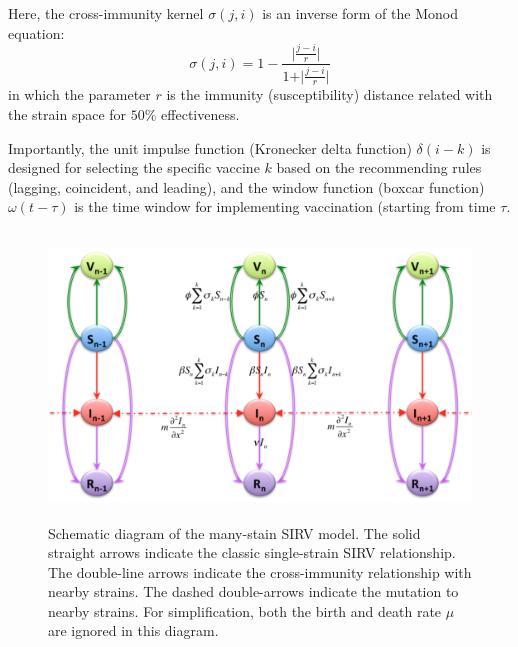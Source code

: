 \documentclass[preprint,12pt]{elsarticle}
\begin{document}
Here, the cross-immunity kernel \(\sigma(j,i)\) is an inverse form of the Monod equation:
\begin{equation}
  \label{eq:Immunity}
  \sigma(j,i) = 1 - \frac{\vert {\frac{j-i}{r}} \vert}{1 + \vert {\frac{j-i}{r}} \vert}
\end{equation}
in which the parameter \(r\) is the immunity (susceptibility) distance related with the strain space for \(50\%\) effectiveness. 

Importantly, the unit impulse function (Kronecker delta function) \(\delta(i-k)\) is designed for selecting the specific vaccine \(k\) based on the recommending rules (lagging, coincident, and leading), and the window function (boxcar function) \(\omega(t-\tau)\) is the time window for implementing vaccination (starting from time \(\tau\).

\begin{figure}
  \centering
  \includegraphics[width=6in,height=3in]{figures/Diagram}
  \caption{Schematic diagram of the many-stain SIRV model.
  The solid straight arrows indicate the classic single-strain SIRV relationship.
  The double-line arrows indicate the cross-immunity relationship with nearby strains.
  The dashed double-arrows indicate the mutation to nearby strains. For simplification, both the birth and death rate \(\mu\) are ignored in this diagram.}
\label{fig:Diagram}
\end{figure}
\end{document}
